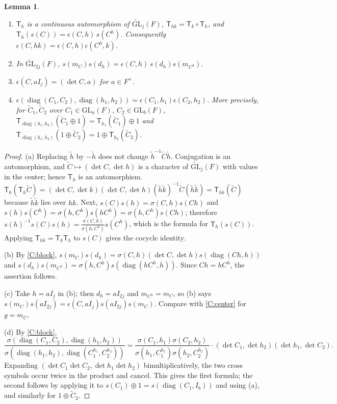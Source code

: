 \documentclass[11pt,oneside,notitlepage]{book}
\numberwithin{equation}{section}
\theoremstyle{plain}
\newtheorem{lemma}[theorem]{Lemma}
\theoremstyle{definition}
\newcommand{\GL}{\mathrm{GL}}
\newcommand{\tGL}{\widetilde{\GL}}
\newcommand{\diag}{\operatorname{diag}}
\newcommand{\hil}[2]{(#1,#2)}
\newcommand{\T}{\mathsf{T}}
\begin{document}
\begin{lemma}\label{lem:eps}
	\begin{enumerate}[label=(\alph*)]
		\item $\T_h$ is a continuous automorphism of $\tGL_j(F)$, $\T_{hk}=\T_k\circ\T_h$, and $\T_h(s(C))=\epsilon(C,h)\,s(C^h)$. Consequently $\epsilon(C,hk)=\epsilon(C,h)\epsilon(C^h,k)$.
		\item In $\tGL_{2j}(F)$, $s(m_C)s(d_h)=\epsilon(C,h)\,s(d_h)s(m_{C^h})$.
		\item $\epsilon(C,aI_j)=\hil{\det C}{a}$ for $a\in F^\times$.
		\item $\epsilon(\diag(C_1,C_2),\diag(h_1,h_2))=\epsilon(C_1,h_1)\epsilon(C_2,h_2)$. More precisely, for $\tilde C_1,\tilde C_2$ over $C_1\in\GL_a(F)$, $C_2\in\GL_b(F)$, $\T_{\diag(h_1,h_2)}(\tilde C_1\oplus1)=\T_{h_1}(\tilde C_1)\oplus1$ and $\T_{\diag(h_1,h_2)}(1\oplus \tilde C_2)=1\oplus\T_{h_2}(\tilde C_2)$.
	\end{enumerate}
\end{lemma}
\begin{proof}
	(a) Replacing $\tilde h$ by $-\tilde h$ does not change $\tilde h^{-1}\tilde C\tilde h$. Conjugation is an automorphism, and $\tilde C\mapsto \hil{\det C}{\det h}$ is a character of $\tGL_j(F)$ with values in the center; hence $\T_h$ is an automorphism. $\T_k(\T_h\tilde C)=\hil{\det C}{\det k}\hil{\det C}{\det h}(\tilde h\tilde k)^{-1}\tilde C(\tilde h\tilde k)=\T_{hk}(\tilde C)$ because $\tilde h\tilde k$ lies over $hk$. Next, $s(C)s(h)=\sigma(C,h)s(Ch)$ and $s(h)s(C^h)=\sigma(h,C^h)s(hC^h)=\sigma(h,C^h)s(Ch)$; therefore $s(h)^{-1}s(C)s(h)=\frac{\sigma(C,h)}{\sigma(h,C^h)}s(C^h)$, which is the formula for $\T_h(s(C))$. Applying $\T_{hk}=\T_k\T_h$ to $s(C)$ gives the cocycle identity.
	
	(b) By \ref{C:block}, $s(m_C)s(d_h)=\sigma(C,h)\hil{\det C}{\det h}s(\diag(Ch,h))$ and $s(d_h)s(m_{C^h})=\sigma(h,C^h)s(\diag(hC^h,h))$. Since $Ch=hC^h$, the assertion follows.
	
	(c) Take $h=aI_j$ in (b); then $d_h=aI_{2j}$ and $m_{C^h}=m_C$, so (b) says $s(m_C)s(aI_{2j})=\epsilon(C,aI_j)s(aI_{2j})s(m_C)$. Compare with \ref{C:center} for $g=m_C$.
	
	(d) By \ref{C:block},
	\[\frac{\sigma(\diag(C_1,C_2),\diag(h_1,h_2))}{\sigma(\diag(h_1,h_2),\diag(C_1^{h_1},C_2^{h_2}))}=\frac{\sigma(C_1,h_1)\sigma(C_2,h_2)}{\sigma(h_1,C_1^{h_1})\sigma(h_2,C_2^{h_2})}\cdot\hil{\det C_1}{\det h_2}\hil{\det h_1}{\det C_2}.\]
	Expanding $\hil{\det C_1\det C_2}{\det h_1\det h_2}$ bimultiplicatively, the two cross symbols occur twice in the product and cancel. This gives the first formula; the second follows by applying it to $s(C_1)\oplus 1=s(\diag(C_1,I_b))$ and using (a), and similarly for $1\oplus\tilde C_2$.
\end{proof}
\end{document}
